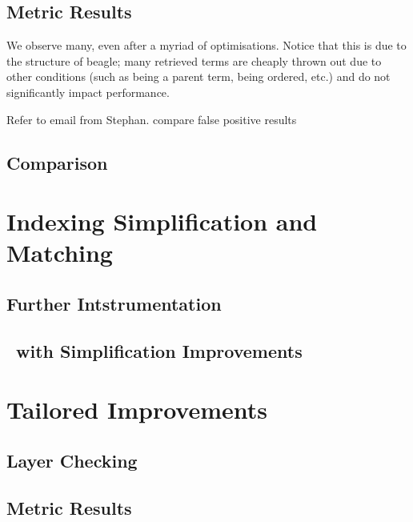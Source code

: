 \subsection{Metric Results}

We observe many, even after a myriad of optimisations. Notice
that this is due to the structure of beagle; many retrieved terms
are cheaply thrown out due to other conditions (such as being a parent
term, being ordered, etc.) and do not significantly impact performance.

Refer to email from Stephan. compare false positive results


\subsection{Comparison}

\section{Indexing Simplification and Matching}
\subsection{Further Intstrumentation}

\subsection{\Beagle\ with Simplification Improvements}

\section{Tailored Improvements}
\label{sec:tailresults}

\subsection{Layer Checking}

\subsection{Metric Results}




